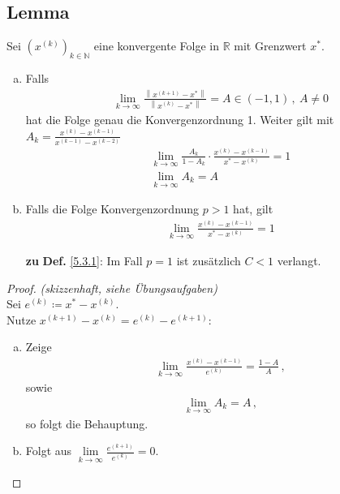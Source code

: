 \documentclass[ngerman,fontsize=11pt, paper=a4, parskip=half, titlepage=true, toc=bib]{scrbook}
\newcommand{\R}{\mathds{R}}
\newcommand{\N}{\mathds{N}}
\newcommand{\nn}[1]{\left\| #1 \right\|}
\begin{document}
	\subsection{Lemma} \label{5.3.5}
	Sei $(x^{(k)})_{k\in\N}$ eine konvergente Folge in $\R$ mit Grenzwert $x^{*}$.
	\begin{enumerate}[a)]
		\item Falls 
		\begin{gather}
			\lim\limits_{k\rightarrow \infty}\frac{\nn{x^{(k+1)}-x^{*}}}{\nn{x^{(k)}-x^{*}}}=
			A\in (-1,1)\, ,~ A\neq 0
			\label{V.3.1}
		\end{gather}
		hat die Folge genau die Konvergenzordnung 1.
		Weiter gilt mit $A_k=\frac{x^{(k)}-x^{(k-1)}}{x^{(k-1)}-x^{(k-2)}}$
				\begin{gather}
					\lim\limits_{k\rightarrow \infty}\frac{A_k}{1-A_k}\cdot 
					\frac{x^{(k)}-x^{(k-1)}}{x^{*}-x^{(k)}}=1 
					\label{V.3.2}
					\\ \nonumber
					\lim\limits_{k\rightarrow\infty}A_k=A
				\end{gather}
		\item Falls die Folge Konvergenzordnung $p>1$ hat, gilt
		\begin{gather}
			\lim\limits_{k\rightarrow\infty}\frac{x^{(k)}-x^{(k-1)}}{x^{*}-x^{(k)}}=1
			\label{V.3.3}
		\end{gather}
		\item[\textbf{zu}]\textbf{Def.} \ref{5.3.1}:  Im Fall $p=1$ ist zusätzlich $C<1 $ verlangt.
	\end{enumerate}
	
	\begin{proof}
		\textit{(skizzenhaft, siehe Übungsaufgaben)}\\
		 Sei $e^{(k)}\coloneqq x^{*}-x^{(k)}$.\\
		 Nutze $x^{(k+1)}-x^{(k)} = e^{(k)}-e^{(k+1)}$:
		 \begin{enumerate}[a)]
		 	\item Zeige 
			 	\begin{gather*} 
				 	\lim\limits_{k\rightarrow\infty}\frac{x^{(k)}-x^{(k-1)}}{e^{(k)}} = \frac{1-A}{A}\, ,
				 \end{gather*}
				 sowie
				 \begin{gather*}
				 	\lim\limits_{k\rightarrow \infty}A_k = A \, ,
				 \end{gather*}
				 so folgt die Behauptung.
			\item Folgt aus $\lim\limits_{k\rightarrow\infty} \frac{e^{(k+1)}}{e^{(k)}} =0$.
		 \end{enumerate}
	\end{proof}
\end{document}
